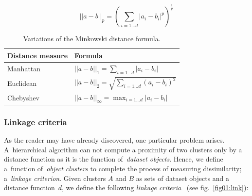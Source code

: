 \begin{equation}\label{eq01:mink}
||a-b||_p = (\sum_{i=1...d}|a_i-b_i|^p)^{\frac{1}{p}}
\end{equation}

\begin{table}
	\centering
	\begin{tabular}{ll}
		\toprule
		Distance measure & Formula \\
		\midrule
		Manhattan & $||a-b||_1 = \sum_{i=1...d}|a_i-b_i|$          \\
		Euclidean & $||a-b||_2 = \sqrt{\sum_{i=1...d}(a_i-b_i)^2}$ \\
		Chebyshev & $||a-b||_\infty = \max_{i=1\dots d}|a_i-b_i|$  \\ \bottomrule
	\end{tabular}
	\caption{Variations of the Minkowski distance formula.}
	\label{tab01:mink}
\end{table}

\subsubsection{Linkage criteria}

As the reader may have already discovered, one particular problem arises. A~hierarchical algorithm can not compute a proximity of two clusters only by a distance function as it is the function of~\emph{dataset objects}. Hence, we define a~function of~\emph{object clusters} to complete the process of measuring dissimilarity; a~\emph{linkage criterion}. Given clusters $A$ and $B$ as sets of dataset objects and a distance function~$d$, we define the following \emph{linkage criteria}~\cite{yim2015hierarchical} (see fig.~\ref{fig01:link}):

